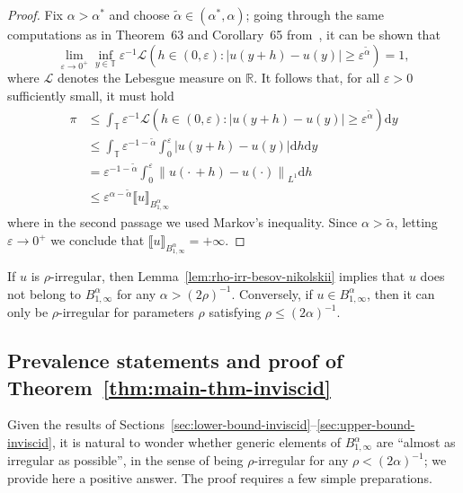 \documentclass[11pt,oneside,reqno]{amsart}
\newcommand{\mathd}{\mathrm{d}}
\numberwithin{equation}{section}
\begin{document}
\begin{proof}
  Fix $\alpha > \alpha^{\ast}$ and choose $\tilde{\alpha} \in (\alpha^{\ast},
  \alpha)$; going through the same computations as in Theorem~63 and
  Corollary~65 from~{\cite{galeati2020prevalence}}, it can be shown that
  \[ \lim_{\varepsilon \rightarrow 0^+} \inf_{y \in \mathbb{T}} \varepsilon^{-
     1} \mathcal{L} (h \in (0, \varepsilon) : | u (y + h) - u (y) | \geqslant
     \varepsilon^{\tilde{\alpha}}) = 1, \]
  where $\mathcal{L}$ denotes the Lebesgue measure on $\mathbb{R}$. It follows
  that, for all $\varepsilon > 0$ sufficiently small, it must hold
%  
  \begin{align*}
    \pi & \leqslant \int_{\mathbb{T}} \varepsilon^{- 1} \mathcal{L} (h \in (0,
    \varepsilon) : | u (y + h) - u (y) | \geqslant
    \varepsilon^{\tilde{\alpha}}) \mathd y\\
    & \leqslant \int_{\mathbb{T}} \varepsilon^{- 1 - \tilde{\alpha}}
    \int_0^{\varepsilon} | u (y + h) - u (y) | \mathd h \mathd y\\
    & = \varepsilon^{- 1 - \tilde{\alpha}} \int_0^{\varepsilon} \left\| u
    \left( \cdot \, + h \right) - u (\cdot) \right\|_{L^1} \mathd h\\
    & \leqslant \varepsilon^{\alpha - \tilde{\alpha}}  \llbracket u
    \rrbracket_{B^{\alpha}_{1, \infty}}
  \end{align*}
%  
  where in the second passage we used Markov's inequality. Since $\alpha >
  \tilde{\alpha}$, letting $\varepsilon \rightarrow 0^+$ we conclude that
  $\llbracket u \rrbracket_{B^{\alpha}_{1, \infty}} = + \infty$.
\end{proof}

\begin{remark}
  If $u$ is $\rho$-irregular, then Lemma~\ref{lem:rho-irr-besov-nikolskii}
  implies that $u$ does not belong to $B^{\alpha}_{1, \infty}$ for any $\alpha
  > (2 \rho)^{- 1}$. Conversely, if $u \in B^{\alpha}_{1, \infty}$, then it
  can only be $\rho$-irregular for parameters $\rho$ satisfying $\rho
  \leqslant (2 \alpha)^{- 1}$.
\end{remark}

\subsection{Prevalence statements and proof of
Theorem~\ref{thm:main-thm-inviscid}}\label{sec:prevalence-mixing}

Given the results of
Sections~\ref{sec:lower-bound-inviscid}--\ref{sec:upper-bound-inviscid}, it is
natural to wonder whether generic elements of $B^{\alpha}_{1, \infty}$ are
``almost as irregular as possible'', in the sense of being $\rho$-irregular
for any $\rho < (2 \alpha)^{- 1}$; we provide here a positive answer. The
proof requires a few simple preparations.
\end{document}
